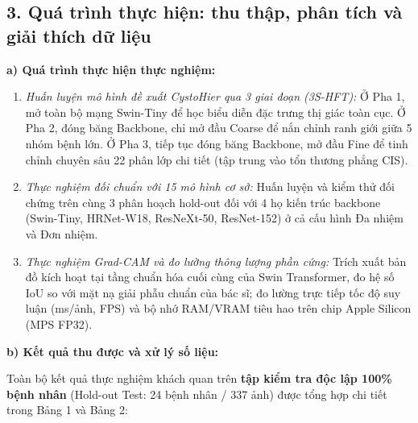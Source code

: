 \documentclass[a4paper]{article}
\begin{document}
\subsection*{3. Quá trình thực hiện: thu thập, phân tích và giải thích dữ liệu}

\noindent\textbf{a) Quá trình thực hiện thực nghiệm:}
\begin{enumerate}
  \item \textit{Huấn luyện mô hình đề xuất CystoHier qua 3 giai đoạn (3S-HFT):} Ở Pha 1, mở toàn bộ mạng Swin-Tiny để học biểu diễn đặc trưng thị giác toàn cục. Ở Pha 2, đóng băng Backbone, chỉ mở đầu Coarse để nắn chỉnh ranh giới giữa 5 nhóm bệnh lớn. Ở Pha 3, tiếp tục đóng băng Backbone, mở đầu Fine để tinh chỉnh chuyên sâu 22 phân lớp chi tiết (tập trung vào tổn thương phẳng CIS).
  \item \textit{Thực nghiệm đối chuẩn với 15 mô hình cơ sở:} Huấn luyện và kiểm thử đối chứng trên cùng 3 phân hoạch hold-out đối với 4 họ kiến trúc backbone (Swin-Tiny, HRNet-W18, ResNeXt-50, ResNet-152) ở cả cấu hình Đa nhiệm và Đơn nhiệm.
  \item \textit{Thực nghiệm Grad-CAM và đo lường thông lượng phần cứng:} Trích xuất bản đồ kích hoạt tại tầng chuẩn hóa cuối cùng của Swin Transformer, đo hệ số IoU so với mặt nạ giải phẫu chuẩn của bác sĩ; đo lường trực tiếp tốc độ suy luận (ms/ảnh, FPS) và bộ nhớ RAM/VRAM tiêu hao trên chip Apple Silicon (MPS FP32).
\end{enumerate}

\noindent\textbf{b) Kết quả thu được và xử lý số liệu:}

Toàn bộ kết quả thực nghiệm khách quan trên \textbf{tập kiểm tra độc lập 100\% bệnh nhân} (Hold-out Test: 24 bệnh nhân / 337 ảnh) được tổng hợp chi tiết trong Bảng 1 và Bảng 2:
\end{document}
